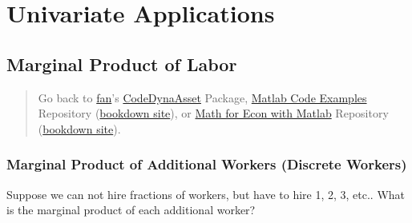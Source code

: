 \documentclass[
]{book}
\begin{document}
\hypertarget{univariate-applications}{%
\chapter{Univariate Applications}\label{univariate-applications}}

\hypertarget{marginal-product-of-labor}{%
\section{Marginal Product of Labor}\label{marginal-product-of-labor}}

\begin{quote}
Go back to \href{http://fanwangecon.github.io/}{fan}'s \href{https://fanwangecon.github.io/CodeDynaAsset/}{CodeDynaAsset} Package, \href{https://fanwangecon.github.io/M4Econ/}{Matlab Code Examples} Repository (\href{https://fanwangecon.github.io/M4Econ/bookdown}{bookdown site}), or \href{https://fanwangecon.github.io/Math4Econ/}{Math for Econ with Matlab} Repository (\href{https://fanwangecon.github.io/Math4Econ/bookdown}{bookdown site}).
\end{quote}

\hypertarget{marginal-product-of-additional-workers-discrete-workers}{%
\subsection{Marginal Product of Additional Workers (Discrete Workers)}\label{marginal-product-of-additional-workers-discrete-workers}}

Suppose we can not hire fractions of workers, but have to hire 1, 2, 3,
etc.. What is the marginal product of each additional worker?
\end{document}
